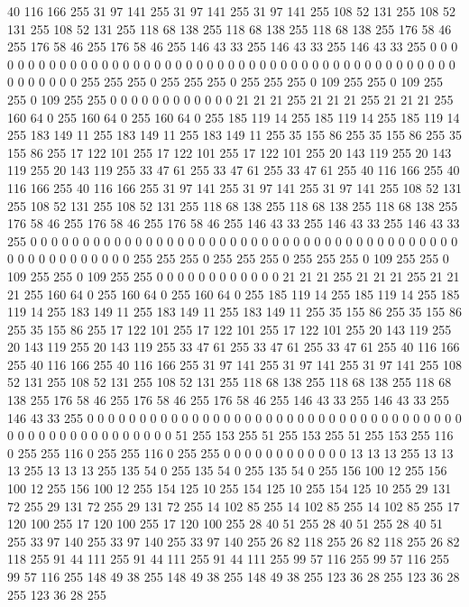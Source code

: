 40 116 166 255 31 97 141 255 31 97 141 255 31 97 141 255 108 52 131 255 108 52 131 255 108 52 131 255 118 68 138 255 118 68 138 255 118 68 138 255 176 58 46 255 176 58 46 255 176 58 46 255 146 43 33 255 146 43 33 255 146 43 33 255
0 0 0 0 0 0 0 0 0 0 0 0 0 0 0 0 0 0 0 0 0 0 0 0 0 0 0 0 0 0 0 0 0 0 0 0 0 0 0 0 0 0 0 0 0 0 0 0 0 0 0 0 0 255 255 255 0 255 255 255 0 255 255 255
0 109 255 255 0 109 255 255 0 109 255 255 0 0 0 0 0 0 0 0 0 0 0 0 21 21 21 255 21 21 21 255 21 21 21 255 160 64 0 255 160 64 0 255 160 64 0 255 185 119 14 255 185 119 14 255 185 119 14 255 183 149 11 255
183 149 11 255 183 149 11 255 35 155 86 255 35 155 86 255 35 155 86 255 17 122 101 255 17 122 101 255 17 122 101 255 20 143 119 255 20 143 119 255 20 143 119 255 33 47 61 255 33 47 61 255 33 47 61 255 40 116 166 255 40 116 166 255
40 116 166 255 31 97 141 255 31 97 141 255 31 97 141 255 108 52 131 255 108 52 131 255 108 52 131 255 118 68 138 255 118 68 138 255 118 68 138 255 176 58 46 255 176 58 46 255 176 58 46 255 146 43 33 255 146 43 33 255 146 43 33 255
0 0 0 0 0 0 0 0 0 0 0 0 0 0 0 0 0 0 0 0 0 0 0 0 0 0 0 0 0 0 0 0 0 0 0 0 0 0 0 0 0 0 0 0 0 0 0 0 0 0 0 0 0 255 255 255 0 255 255 255 0 255 255 255
0 109 255 255 0 109 255 255 0 109 255 255 0 0 0 0 0 0 0 0 0 0 0 0 21 21 21 255 21 21 21 255 21 21 21 255 160 64 0 255 160 64 0 255 160 64 0 255 185 119 14 255 185 119 14 255 185 119 14 255 183 149 11 255
183 149 11 255 183 149 11 255 35 155 86 255 35 155 86 255 35 155 86 255 17 122 101 255 17 122 101 255 17 122 101 255 20 143 119 255 20 143 119 255 20 143 119 255 33 47 61 255 33 47 61 255 33 47 61 255 40 116 166 255 40 116 166 255
40 116 166 255 31 97 141 255 31 97 141 255 31 97 141 255 108 52 131 255 108 52 131 255 108 52 131 255 118 68 138 255 118 68 138 255 118 68 138 255 176 58 46 255 176 58 46 255 176 58 46 255 146 43 33 255 146 43 33 255 146 43 33 255
0 0 0 0 0 0 0 0 0 0 0 0 0 0 0 0 0 0 0 0 0 0 0 0 0 0 0 0 0 0 0 0 0 0 0 0 0 0 0 0 0 0 0 0 0 0 0 0 0 0 0 0 51 255 153 255 51 255 153 255 51 255 153 255
116 0 255 255 116 0 255 255 116 0 255 255 0 0 0 0 0 0 0 0 0 0 0 0 13 13 13 255 13 13 13 255 13 13 13 255 135 54 0 255 135 54 0 255 135 54 0 255 156 100 12 255 156 100 12 255 156 100 12 255 154 125 10 255
154 125 10 255 154 125 10 255 29 131 72 255 29 131 72 255 29 131 72 255 14 102 85 255 14 102 85 255 14 102 85 255 17 120 100 255 17 120 100 255 17 120 100 255 28 40 51 255 28 40 51 255 28 40 51 255 33 97 140 255 33 97 140 255
33 97 140 255 26 82 118 255 26 82 118 255 26 82 118 255 91 44 111 255 91 44 111 255 91 44 111 255 99 57 116 255 99 57 116 255 99 57 116 255 148 49 38 255 148 49 38 255 148 49 38 255 123 36 28 255 123 36 28 255 123 36 28 255
